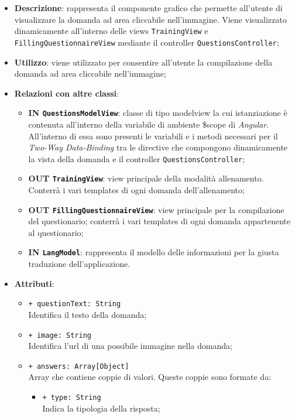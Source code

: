 		\begin{itemize}
			\item \textbf{Descrizione}: rappresenta il componente grafico che permette all'utente di visualizzare la domanda ad area cliccabile nell'immagine. Viene visualizzato dinamicamente all'interno delle views \texttt{TrainingView} e \texttt{FillingQuestionnaireView} mediante il controller \texttt{QuestionsController};
			\item \textbf{Utilizzo}: viene utilizzato per consentire all'utente la compilazione della domanda ad area cliccabile nell'immagine;
			\item \textbf{Relazioni con altre classi}: 
			\begin{itemize}
				\item \textbf{IN \texttt{QuestionsModelView}}: classe di tipo modelview la cui istanziazione è contenuta all'interno della variabile di ambiente \$scope di \textit{Angular}. All'interno di essa sono presenti le variabili e i metodi necessari per il \textit{Two-Way Data-Binding} tra le directive che compongono dinamicamente la vista della domanda e il controller \texttt{QuestionsController};
				\item \textbf{OUT \texttt{TrainingView}}: view principale della modalità allenamento. Conterrà i vari templates di ogni domanda dell'allenamento;
				\item \textbf{OUT \texttt{FillingQuestionnaireView}}: view principale per la compilazione del questionario; conterrà i vari templates di ogni domanda appartenente al questionario;   
				\item \textbf{IN \texttt{LangModel}}: rappresenta il modello delle informazioni per la giusta traduzione dell'applicazione.				
			\end{itemize}
			\item \textbf{Attributi}: 
				\begin{itemize}
					\item \texttt{+ questionText: String} \\ Identifica il testo della domanda;
					\item \texttt{+ image: String} \\ Identifica l'url di una possibile immagine nella domanda;
					\item \texttt{+ answers: Array[Object]} \\ Array che contiene coppie di valori. Queste coppie sono formate da:
					\begin{itemize}
						\item \texttt{+ type: String} \\ Indica la tipologia della risposta;

\end{itemize}
\end{itemize}
\end{itemize}
